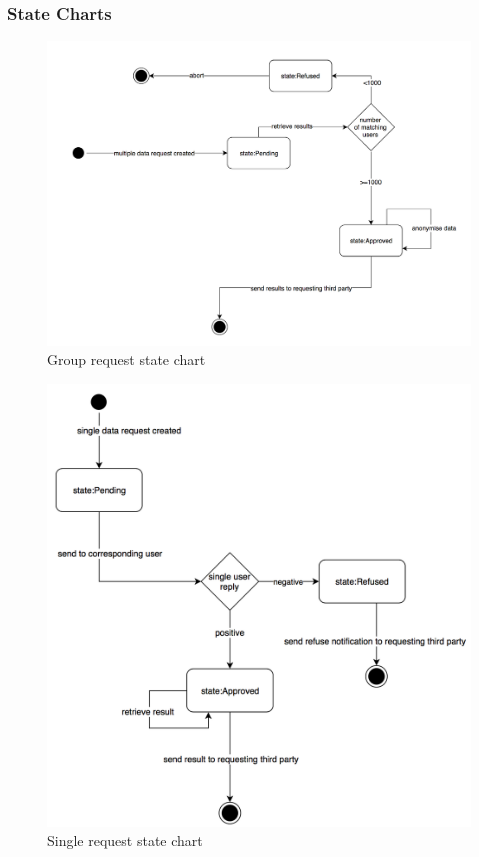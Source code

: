 \documentclass[titlepage]{article}
\begin{document}
		\subsubsection{State Charts}
		\begin{figure}[H]
			\center
  			\includegraphics[width=\textwidth]{Diagrammi/groupStateChart.png}
  			\caption{ Group request state chart}
 			\label{fig:groupStateChart}
		\end{figure}
		\begin{figure}[H]
			\center
  			\includegraphics[width=\textwidth]{Diagrammi/singleStateChart.png}
  			\caption{ Single request state chart}
 			\label{fig:singleStateChart}
		\end{figure}
\end{document}
